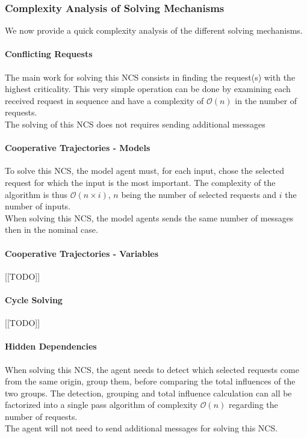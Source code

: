 \subsubsection*{Complexity Analysis of Solving Mechanisms}

We now provide a quick complexity analysis of the different solving mechanisms.

\paragraph*{Conflicting Requests}

The main work for solving this NCS consists in finding the request(s) with the highest criticality. This very simple operation can be done by examining each received request in sequence and have a complexity of $\mathcal{O}(n)$ in the number of requests.\\
The solving of this NCS does not requires sending additional messages

\paragraph*{Cooperative Trajectories - Models}

To solve this NCS, the model agent must, for each input, chose the selected request for which the input is the most important. The complexity of the algorithm is thus $\mathcal{O}(n \times i)$, $n$ being the number of selected requests and $i$ the number of inputs.\\
When solving this NCS, the model agents sends the same number of messages then in the nominal case.

\paragraph*{Cooperative Trajectories - Variables}

[[TODO]]

\paragraph*{Cycle Solving}

[[TODO]]

\paragraph*{Hidden Dependencies}
When solving this NCS, the agent needs to detect which selected requests come from the same origin, group them, before comparing the total influences of the two groups. The detection, grouping and total influence calculation can all be factorized into a single pass algorithm of complexity $\mathcal{O}(n)$ regarding the number of requests.\\
The agent will not need to send additional messages for solving this NCS.

